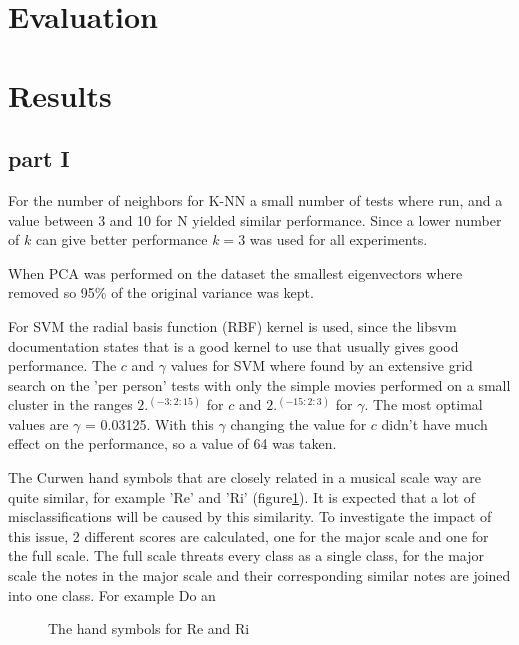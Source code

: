 \section{Evaluation}


\section{Results}

\subsection{part I}
For the number of neighbors for K-NN a small number of tests where run, and a value between 3 and 10 for N yielded similar performance. Since a lower number of $k$ can give better performance $k=3$ was used for all experiments.

When PCA was performed on the dataset the smallest eigenvectors where removed so 95\% of the original variance was kept.

For SVM the radial basis function (RBF) kernel is used, since the libsvm documentation states that is a good kernel to use that usually gives good performance. The $c$ and $\gamma$ values for SVM where found by an extensive grid search on the 'per person' tests with only the simple movies performed on a small cluster in the ranges $2.^(-3:2:15)$ for $c$ and $2.^(-15:2:3)$ for $\gamma$. The most optimal values are $\gamma$ = 0.03125. With this $\gamma$ changing the value for $c$ didn't have much effect on the performance, so a value of 64 was taken.

The Curwen hand symbols that are closely related in a musical scale way are quite similar, for example 'Re' and 'Ri' (figure\ref{fig:reri}). It is expected that a lot of misclassifications will be caused by this similarity. To investigate the impact of this issue, 2 different scores are calculated, one for the major scale and one for the full scale. The full scale threats every class as a single class, for the major scale the notes in the major scale and their corresponding similar notes are joined into one class. For example Do an

\begin{figure}[h]
  \centering
{}
\hspace{0.03\linewidth}
  \caption{The hand symbols for Re and Ri}
  \label{fig:reri}
\end{figure}




